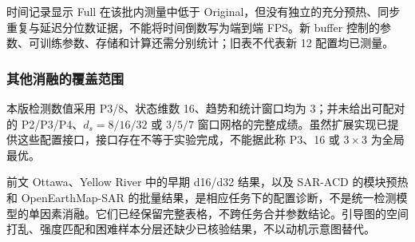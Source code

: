 时间记录显示 Full 在该批内测量中低于 Original，但没有独立的充分预热、同步重复与延迟分位数证据，不能将时间倒数写为端到端 FPS。新 buffer 控制的参数、可训练参数、存储和计算还需分别统计；旧表不代表新 12 配置均已测量。

\subsubsection{其他消融的覆盖范围}
本版检测数值采用 P3/8、状态维数 16、趋势和统计窗口均为 3；并未给出可配对的 P2/P3/P4、$d_s=8/16/32$ 或 $3/5/7$ 窗口网格的完整成绩。虽然扩展实现已提供这些配置接口，接口存在不等于实验完成，不能据此称 P3、16 或 $3\times3$ 为全局最优。

前文 Ottawa、Yellow River 中的早期 d16/d32 结果，以及 SAR-ACD 的模块预热和 OpenEarthMap-SAR 的批量结果，是相应任务下的配置诊断，不是统一检测模型的单因素消融。它们已经保留完整表格，不跨任务合并参数结论。引导图的空间打乱、强度匹配和困难样本分层还缺少已核验结果，不以动机示意图替代。
